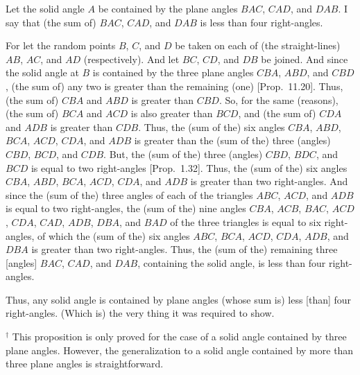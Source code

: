 \begin{Parallel}{}{}
{Let the solid angle $A$ be contained by the plane angles $BAC$,
$CAD$, and $DAB$. I say that (the sum of) $BAC$, $CAD$, and $DAB$
is less than four right-angles.

For let the random points $B$, $C$, and $D$ be taken on each of (the straight-lines)
 $AB$, $AC$, and $AD$ (respectively). And let $BC$, $CD$, and $DB$ be joined.  And since the solid angle at $B$ is contained
by the three plane angles $CBA$, $ABD$, and $CBD$, (the sum of) any two
is greater than the remaining (one) [Prop.~11.20].
Thus, (the sum of) $CBA$ and $ABD$ is greater than $CBD$. So, for
the same (reasons), (the sum of) $BCA$ and $ACD$ is also greater than
$BCD$, and (the sum of) $CDA$ and $ADB$ is greater than $CDB$.
Thus, the (sum of the) six angles $CBA$, $ABD$, $BCA$, $ACD$, $CDA$,
and $ADB$ is greater than the (sum of the) three (angles) $CBD$, $BCD$,
and $CDB$. But, the (sum of the) three (angles) $CBD$, $BDC$, and
$BCD$ is equal to two right-angles [Prop.~1.32].
Thus, the (sum of the) six angles $CBA$, $ABD$, $BCA$, $ACD$, $CDA$,
and $ADB$ is greater than two right-angles.
And since the (sum of the) three angles of each of the triangles
$ABC$, $ACD$, and $ADB$ is equal to two right-angles, the (sum of the)
nine angles $CBA$, $ACB$, $BAC$, $ACD$, $CDA$, $CAD$, $ADB$,
$DBA$, and $BAD$ of the three triangles is equal to six right-angles,
of which the (sum of the) six angles $ABC$, $BCA$, $ACD$, $CDA$,
$ADB$, and $DBA$ is greater than two right-angles. Thus, the (sum of the)
remaining three [angles] $BAC$, $CAD$, and $DAB$, containing the
solid angle, is less than four right-angles.

Thus, any solid angle is contained by plane angles (whose sum is) less [than]
four  right-angles. (Which is) the very thing it was required to show.}
\end{Parallel}
{\footnotesize\noindent$^\dag$ This proposition is only proved for the case of a solid angle contained by three plane angles. However, the generalization to
a solid angle contained by more than three plane angles is straightforward.}

